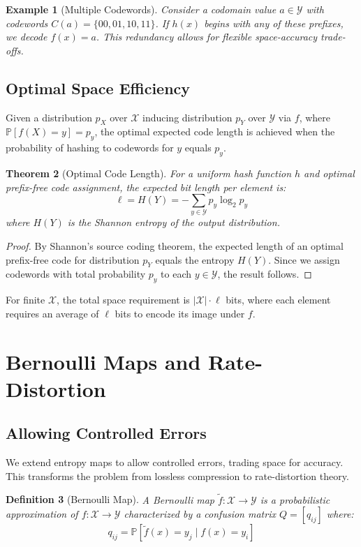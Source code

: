 \documentclass[11pt]{article}
\newtheorem{theorem}{Theorem}
\newtheorem{definition}[theorem]{Definition}
\newtheorem{example}[theorem]{Example}
\newcommand{\calX}{\mathcal{X}}
\newcommand{\calY}{\mathcal{Y}}
\renewcommand{\Pr}{\mathbb{P}}
\begin{document}
\begin{example}[Multiple Codewords]
Consider a codomain value $a \in \calY$ with codewords $C(a) = \{00, 01, 10, 11\}$. If $h(x)$ begins with any of these prefixes, we decode $f(x) = a$. This redundancy allows for flexible space-accuracy trade-offs.
\end{example}

\subsection{Optimal Space Efficiency}

Given a distribution $p_X$ over $\calX$ inducing distribution $p_Y$ over $\calY$ via $f$, where $\Pr[f(X) = y] = p_y$, the optimal expected code length is achieved when the probability of hashing to codewords for $y$ equals $p_y$.

\begin{theorem}[Optimal Code Length]
For a uniform hash function $h$ and optimal prefix-free code assignment, the expected bit length per element is:
\[
\ell = H(Y) = -\sum_{y \in \calY} p_y \log_2 p_y
\]
where $H(Y)$ is the Shannon entropy of the output distribution.
\end{theorem}

\begin{proof}
By Shannon's source coding theorem, the expected length of an optimal prefix-free code for distribution $p_Y$ equals the entropy $H(Y)$. Since we assign codewords with total probability $p_y$ to each $y \in \calY$, the result follows.
\end{proof}

For finite $\calX$, the total space requirement is $|\calX| \cdot \ell$ bits, where each element requires an average of $\ell$ bits to encode its image under $f$.

\section{Bernoulli Maps and Rate-Distortion}

\subsection{Allowing Controlled Errors}

We extend entropy maps to allow controlled errors, trading space for accuracy. This transforms the problem from lossless compression to rate-distortion theory.

\begin{definition}[Bernoulli Map]
A Bernoulli map $\tilde{f}: \calX \to \calY$ is a probabilistic approximation of $f: \calX \to \calY$ characterized by a confusion matrix $Q = [q_{ij}]$ where:
\[
q_{ij} = \Pr[\tilde{f}(x) = y_j \mid f(x) = y_i]
\]
\end{definition}
\end{document}
